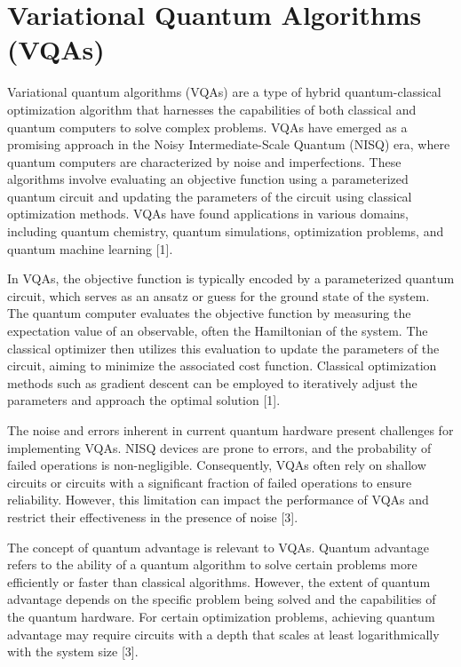 \documentclass[inscr,ack,preface]{diphdthesis}
\begin{document}
\section{Variational Quantum Algorithms (VQAs)}

Variational quantum algorithms (VQAs) are a type of hybrid quantum-classical optimization algorithm that harnesses the capabilities of both classical and quantum computers to solve complex problems. VQAs have emerged as a promising approach in the Noisy Intermediate-Scale Quantum (NISQ) era, where quantum computers are characterized by noise and imperfections. These algorithms involve evaluating an objective function using a parameterized quantum circuit and updating the parameters of the circuit using classical optimization methods. VQAs have found applications in various domains, including quantum chemistry, quantum simulations, optimization problems, and quantum machine learning [1].

In VQAs, the objective function is typically encoded by a parameterized quantum circuit, which serves as an ansatz or guess for the ground state of the system. The quantum computer evaluates the objective function by measuring the expectation value of an observable, often the Hamiltonian of the system. The classical optimizer then utilizes this evaluation to update the parameters of the circuit, aiming to minimize the associated cost function. Classical optimization methods such as gradient descent can be employed to iteratively adjust the parameters and approach the optimal solution [1].

The noise and errors inherent in current quantum hardware present challenges for implementing VQAs. NISQ devices are prone to errors, and the probability of failed operations is non-negligible. Consequently, VQAs often rely on shallow circuits or circuits with a significant fraction of failed operations to ensure reliability. However, this limitation can impact the performance of VQAs and restrict their effectiveness in the presence of noise [3].

The concept of quantum advantage is relevant to VQAs. Quantum advantage refers to the ability of a quantum algorithm to solve certain problems more efficiently or faster than classical algorithms. However, the extent of quantum advantage depends on the specific problem being solved and the capabilities of the quantum hardware. For certain optimization problems, achieving quantum advantage may require circuits with a depth that scales at least logarithmically with the system size [3].
\end{document}
